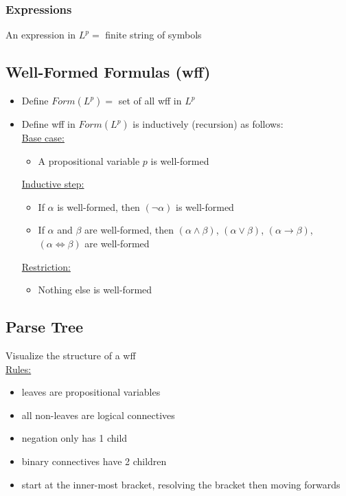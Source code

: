 \documentclass[11pt]{article}
\begin{document}
\subsubsection{Expressions}
An expression in $L^p = $ finite string of symbols 
\subsection{Well-Formed Formulas (wff)}
\begin{itemize}
    \item Define $Form(L^p) = $ set of all wff in $L^p$ 
    \item Define wff in $Form(L^p)$ is inductively (recursion) as follows: \\
    \underline{Base case: }
    \begin{itemize}
        \item A propositional variable $p$ is well-formed 
    \end{itemize}
    \underline{Inductive step: }
    \begin{itemize}
        \item If $\alpha$ is well-formed, then $(\neg\alpha)$ is well-formed 
        \item If $\alpha$ and $\beta$ are well-formed, then $(\alpha\land\beta)$, $(\alpha\lor\beta)$, $(\alpha\rightarrow\beta)$, $(\alpha\iff\beta)$ are well-formed 
    \end{itemize}
    \underline{Restriction: }
    \begin{itemize}
        \item Nothing else is well-formed 
    \end{itemize}
\end{itemize}
\subsection{Parse Tree}
Visualize the structure of a wff \\
\underline{Rules: }
\begin{itemize}
    \item leaves are propositional variables 
    \item all non-leaves are logical connectives 
    \item negation only has 1 child
    \item binary connectives have 2 children 
    \item start at the inner-most bracket, resolving the bracket then moving forwards
\end{itemize}
\end{document}
